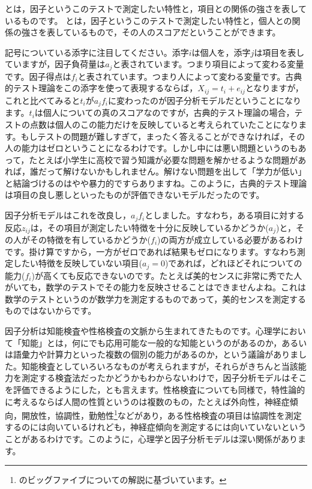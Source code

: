 \documentclass{ltjsbook}
\begin{document}
とは，因子というこのテストで測定したい特性と，項目との関係の強さを表しているものです。
とは，因子というこのテストで測定したい特性と，個人との関係の強さを表しているもので，その人のスコアだということができます。

記号についている添字に注目してください。添字$i$は個人を，添字$j$は項目を表していますが，因子負荷量は$a_j$と表されています。つまり項目によって変わる変量です。因子得点は$f_i$と表されています。つまり人によって変わる変量です。古典的テスト理論をこの添字を使って表現するならば，$X_{ij} = t_i + e_{ij}$となりますが，これと比べてみると$t_i$が$a_jf_i$に変わったのが因子分析モデルだということになります。$t_i$は個人についての真のスコアなのですが，古典的テスト理論の場合，テストの点数は個人のこの能力だけを反映していると考えられていたことになります。もしテストの問題が難しすぎて，まったく答えることができなければ，その人の能力はゼロということになるわけです。しかし中には悪い問題というのもあって，たとえば小学生に高校で習う知識が必要な問題を解かせるような問題があれば，誰だって解けないかもしれません。解けない問題を出して「学力が低い」と結論づけるのはやや暴力的ですらありますね。このように，古典的テスト理論は項目の良し悪しといったものが評価できないモデルだったのです。

因子分析モデルはこれを改良し，$a_j f_i$としました。すなわち，ある項目に対する反応$z_{ij}$は，その項目が測定したい特徴を十分に反映しているかどうか($a_j$)と，その人がその特徴を有しているかどうか($f_i$)の両方が成立している必要があるわけです。掛け算ですから，一方がゼロであれば結果もゼロになります。すなわち測定したい特徴を反映していない項目($a_j=0$)であれば，どれほどそれについての能力($f_i$)が高くても反応できないのです。たとえば美的センスに非常に秀でた人がいても，数学のテストでその能力を反映させることはできませんよね。これは数学のテストというのが数学力を測定するものであって，美的センスを測定するものではないからです。

因子分析は知能検査や性格検査の文脈から生まれてきたものです。心理学において「知能」とは，何にでも応用可能な一般的な知能というのがあるのか，あるいは語彙力や計算力といった複数の個別の能力があるのか，という議論がありました。知能検査としていろいろなものが考えられますが，それらがきちんと当該能力を測定する検査法だったかどうかもわからないわけで，因子分析モデルはそこを評価できるようにした，とも言えます。性格検査についても同様で，特性論的に考えるならば人間の性質というのは複数のもの，たとえば外向性，神経症傾向，開放性，協調性，勤勉性\footnote{\textcite{Oshio2020}のビッグファイブについての解説に基づいています。}などがあり，ある性格検査の項目は協調性を測定するのには向いているけれども，神経症傾向を測定するには向いていないということがあるわけです。このように，心理学と因子分析モデルは深い関係があります。
\end{document}
